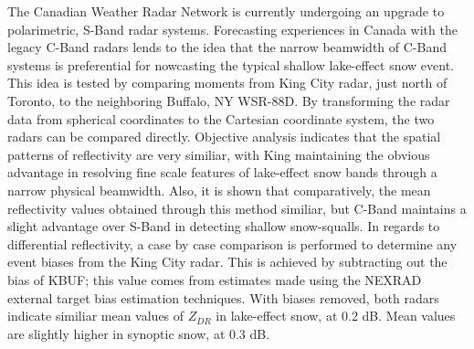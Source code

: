 The Canadian Weather Radar Network is currently undergoing an upgrade to polarimetric, S-Band radar 
systems. Forecasting experiences in Canada with the legacy C-Band radars lends to the idea that the 
narrow beamwidth of C-Band systems is preferential for nowcasting the typical shallow lake-effect snow 
event. This idea is tested by comparing moments from King City radar, just north of Toronto, to the 
neighboring Buffalo, NY WSR-88D. By transforming the radar data from spherical coordinates to the 
Cartesian coordinate system, the two radars can be compared directly. Objective analysis indicates that 
the spatial patterns of reflectivity are very similiar, with King maintaining the obvious advantage in 
resolving fine scale features of lake-effect snow bands through a narrow physical beamwidth. Also, it is 
shown that comparatively, the mean reflectivity values obtained through this method similiar, but C-Band maintains a slight advantage over S-Band in 
detecting shallow snow-squalls. In regards to differential reflectivity, a case by case comparison is performed to determine any event biases
from the King City radar. This is achieved by subtracting out the bias of KBUF; this value comes from 
estimates made using the NEXRAD external target bias estimation techniques. With biases removed, both radars indicate similiar mean values of $Z_{DR}$ in lake-effect snow, at 0.2 dB. Mean values are slightly higher in synoptic snow, at 0.3 dB.
